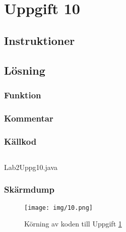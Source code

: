 \section{Uppgift 10}\label{sec:uppg10}

\subsection{Instruktioner}


\subsection{Lösning}
\subsubsection{Funktion}

\subsubsection{Kommentar}


\subsubsection{Källkod}
\inputminted[linenos]{java}{src/Lab2Uppg10.java}
\caption{Lab2Uppg10.java}
\label{src:uppg10}


\subsubsection{Skärmdump}
\begin{figure}[htbp]
    \centering
        \texttt{[image: img/10.png]}
    \caption{Körning av koden till Uppgift \ref{sec:uppg10}}
    \label{fig:uppg10-screenshot}
\end{figure}

